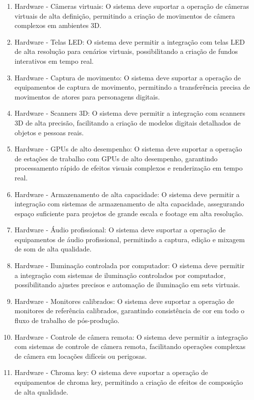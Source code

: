 \begin{enumerate}
  \item Hardware - Câmeras virtuais: O sistema deve suportar a operação de câmeras virtuais de alta definição, permitindo a criação de movimentos de câmera complexos em ambientes 3D.
  \item Hardware - Telas LED: O sistema deve permitir a integração com telas LED de alta resolução para cenários virtuais, possibilitando a criação de fundos interativos em tempo real.
  \item Hardware - Captura de movimento: O sistema deve suportar a operação de equipamentos de captura de movimento, permitindo a transferência precisa de movimentos de atores para personagens digitais.
  \item Hardware - Scanners 3D: O sistema deve permitir a integração com scanners 3D de alta precisão, facilitando a criação de modelos digitais detalhados de objetos e pessoas reais.
  \item Hardware - GPUs de alto desempenho: O sistema deve suportar a operação de estações de trabalho com GPUs de alto desempenho, garantindo processamento rápido de efeitos visuais complexos e renderização em tempo real.
  \item Hardware - Armazenamento de alta capacidade: O sistema deve permitir a integração com sistemas de armazenamento de alta capacidade, assegurando espaço suficiente para projetos de grande escala e footage em alta resolução.
  \item Hardware - Áudio profissional: O sistema deve suportar a operação de equipamentos de áudio profissional, permitindo a captura, edição e mixagem de som de alta qualidade.
  \item Hardware - Iluminação controlada por computador: O sistema deve permitir a integração com sistemas de iluminação controlados por computador, possibilitando ajustes precisos e automação de iluminação em sets virtuais.
  \item Hardware - Monitores calibrados: O sistema deve suportar a operação de monitores de referência calibrados, garantindo consistência de cor em todo o fluxo de trabalho de pós-produção.
  \item Hardware - Controle de câmera remota: O sistema deve permitir a integração com sistemas de controle de câmera remota, facilitando operações complexas de câmera em locações difíceis ou perigosas.
  \item Hardware - Chroma key: O sistema deve suportar a operação de equipamentos de chroma key, permitindo a criação de efeitos de composição de alta qualidade.

\end{enumerate}

